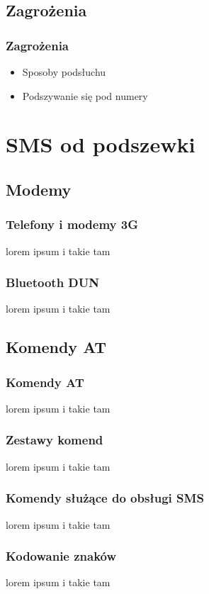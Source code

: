 \documentclass[xcolor=table]{beamer}
\begin{document}
\subsection{Zagrożenia}
\begin{frame}
  \frametitle{Zagrożenia}

\begin{itemize}
\item Sposoby podsłuchu 
\item Podszywanie się pod numery
\end{itemize}

\end{frame}

\section{SMS od podszewki}

\subsection{Modemy}
\begin{frame}
  \frametitle{Telefony i modemy 3G}

lorem ipsum i takie tam

\end{frame}

\begin{frame}
  \frametitle{Bluetooth DUN}

lorem ipsum i takie tam

\end{frame}
\subsection{Komendy AT}
\begin{frame}
  \frametitle{Komendy AT}

lorem ipsum i takie tam

\end{frame}

\begin{frame}
  \frametitle{Zestawy komend}

lorem ipsum i takie tam

\end{frame}
\begin{frame}
  \frametitle{Komendy służące do obsługi SMS}

lorem ipsum i takie tam

\end{frame}
\begin{frame}
  \frametitle{Kodowanie znaków}

lorem ipsum i takie tam

\end{frame}
\end{document}
